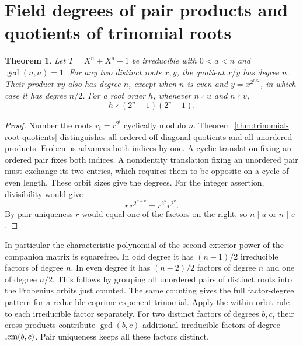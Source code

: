 \documentclass[11pt]{article}
\newtheorem{theorem}{Theorem}
\begin{document}
\section{Field degrees of pair products and quotients of trinomial roots}
\begin{theorem}\label{thm:trinomial-pair-degrees}
Let \(T=X^n+X^a+1\) be irreducible with \(0<a<n\) and \(\gcd(n,a)=1\).
For any two distinct roots \(x,y\), the quotient \(x/y\) has degree \(n\).
Their product \(xy\) also has degree \(n\), except when \(n\) is even
and \(y=x^{2^{n/2}}\), in which case it has degree \(n/2\).
For a root order \(h\), whenever \(n\nmid u\) and \(n\nmid v\),
\[
          h\nmid(2^u-1)(2^v-1).
\]
\end{theorem}
\begin{proof}
Number the roots \(r_i=r^{2^i}\) cyclically modulo \(n\).
Theorem~\ref{thm:trinomial-root-quotients} distinguishes all ordered
off-diagonal quotients and all unordered products. Frobenius advances
both indices by one. A cyclic translation fixing an ordered pair
fixes both indices. A nonidentity translation fixing an unordered
pair must exchange its two entries, which requires them to be
opposite on a cycle of even length. These orbit sizes give the degrees.
For the integer assertion, divisibility would give
\[
      r\,r^{2^{u+v}}=r^{2^u}r^{2^v}.
\]
By pair uniqueness \(r\) would equal one of the factors on the right,
so \(n\mid u\) or \(n\mid v\).
\end{proof}

In particular the characteristic polynomial of the second exterior
power of the companion matrix is squarefree. In odd degree it has
\((n-1)/2\) irreducible factors of degree \(n\).
In even degree it has \((n-2)/2\) factors of degree \(n\) and one of degree
\(n/2\). This follows by grouping all unordered pairs of distinct
roots into the Frobenius orbits just counted.
The same counting gives the full factor-degree pattern for a reducible
coprime-exponent trinomial. Apply the within-orbit rule to each
irreducible factor separately. For two distinct factors of degrees
\(b,c\), their cross products contribute \(\gcd(b,c)\) additional
irreducible factors of degree \(\mathop{\rm lcm}(b,c)\). Pair uniqueness
keeps all these factors distinct.
\end{document}
